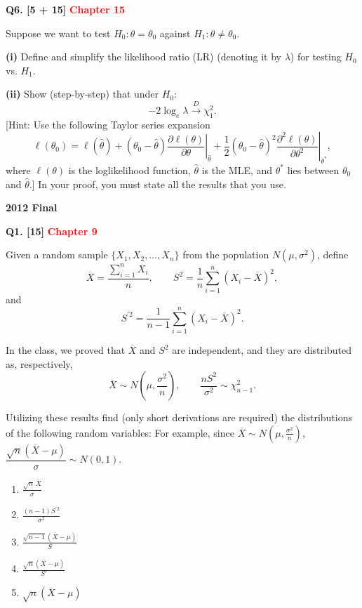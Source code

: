\documentclass[11pt]{article}
\begin{document}
\bigskip

\textbf{Q6. [5 + 15]} \textbf{\textcolor{red}{Chapter 15}}

Suppose we want to test $H_0:\theta=\theta_0$ against $H_1:\theta\neq\theta_0$.

\textbf{(i)} Define and simplify the likelihood ratio (LR) (denoting it by $\lambda$) for testing $H_0$ vs. $H_1$.

\textbf{(ii)} Show (step-by-step) that under $H_0$:
\[
-2\log_e\lambda\xrightarrow{D}\chi_1^2.
\]
[Hint: Use the following Taylor series expansion
\[
\ell(\theta_0)=\ell(\hat\theta)+(\theta_0-\hat\theta)
\left.\frac{\partial\ell(\theta)}{\partial\theta}\right|_{\hat\theta}
+\frac12(\theta_0-\hat\theta)^2
\left.\frac{\partial^2\ell(\theta)}{\partial\theta^2}\right|_{\theta^*},
\]
where $\ell(\theta)$ is the loglikelihood function, $\hat\theta$ is the MLE, and $\theta^*$ lies between $\theta_0$ and $\hat\theta$.] In your proof, you must state all the results that you use.



\clearpage

\begin{center}
    {\Large\bfseries 2012 Final}
\end{center}

\vspace{1em}

\textbf{Q1. [15]} \textbf{\textcolor{red}{Chapter 9}}

Given a random sample $\{X_1,X_2,\ldots,X_n\}$ from the population $N(\mu,\sigma^2)$, define
\[
\overline X=\frac{\sum_{i=1}^{n}X_i}{n},\qquad
S^2=\frac{1}{n}\sum_{i=1}^{n}(X_i-\overline X)^2,
\]
and
\[
S^{\prime 2}=\frac{1}{n-1}\sum_{i=1}^{n}(X_i-\overline X)^2.
\]

In the class, we proved that $\overline X$ and $S^2$ are independent, and they are distributed as, respectively,
\[
\overline X\sim N\!\left(\mu,\frac{\sigma^2}{n}\right),\qquad
\frac{nS^2}{\sigma^2}\sim\chi_{n-1}^2.
\]

Utilizing these results find (only short derivations are required) the distributions of the following random variables: For example, since $\overline X\sim N\!\left(\mu,\frac{\sigma^2}{n}\right)$, $\dfrac{\sqrt{n}(\overline X-\mu)}{\sigma}\sim N(0,1)$.

\begin{enumerate}
\item[(i)] $\displaystyle \frac{\sqrt{n}\,\overline X}{\sigma}$
\item[(ii)] $\displaystyle \frac{(n-1)S^{\prime 2}}{\sigma^2}$
\item[(iii)] $\displaystyle \frac{\sqrt{n-1}(\overline X-\mu)}{S}$
\item[(iv)] $\displaystyle \frac{\sqrt n(\overline X-\mu)}{S'}$
\item[(v)] $\displaystyle \sqrt{n}(\overline X-\mu)$
\end{enumerate}
\end{document}

